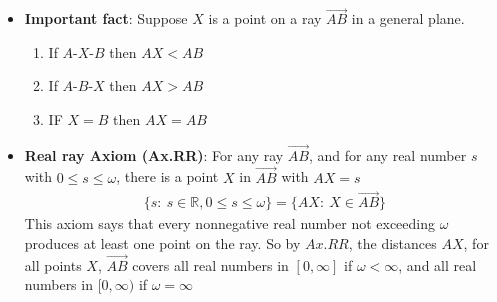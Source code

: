 \documentclass{report}
\begin{document}
\begin{itemize}
        \item \textbf{Important fact}:  Suppose $X$ is a point on a ray $\overrightarrow{AB}$ in a general plane.
            \begin{enumerate}
                \item If $ A\text{-}X\text{-}B$ then $AX < AB $
                \item If $ A\text{-}B\text{-}X$ then $AX > AB $
                \item IF $X = B$ then $AX = AB$
            \end{enumerate}
        \item \textbf{Real ray Axiom (Ax.RR)}: For any ray $ \overrightarrow{AB}$, and for any real number $s $ with $0 \leq s \leq \omega$, there is a point $X$ in $\overrightarrow{AB}$ with $AX = s$
            \begin{align*}
                \{s:\ s \in \mathbb{R}, 0 \leq s \leq \omega \} = \{AX:\ X \in \overrightarrow{AB}\}
            \end{align*}
            This axiom says that every nonnegative real number not exceeding $\omega$ produces at least one point on the ray.
            \bigbreak \noindent 
            So by $Ax.RR$, the distances $AX$, for all points $X$, $ \overrightarrow{AB}$ covers all real numbers in $[0,\infty]$ if $\omega < \infty$, and all real numbers in $[0,\infty) $ if $\omega = \infty $
    \end{itemize}



    \pagebreak 
\end{document}
